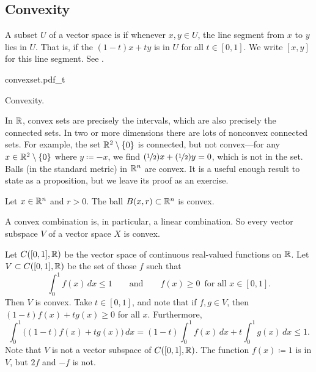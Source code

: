 \subsection{Convexity}

A subset $U$ of a vector space is \emph{}
if whenever $x,y \in U$, the line segment from
$x$ to $y$ lies in $U$.  That is, if the \emph{}
$(1-t)x+ty$ is in $U$ for all $t \in [0,1]$.
We write $[x,y]$ for this line segment.
See .

\begin{myfigureht}
{convexset.pdf_t}
\caption{Convexity.\label{mv:convexcomb}}
\end{myfigureht}

In ${\mathbb{R}}$, convex sets are precisely the intervals, which are
also precisely the connected sets.
In two or more dimensions
there are lots of nonconvex connected sets.  For example,
the set ${\mathbb{R}}^2 \setminus \{0\}$ is connected,
but not convex---for any $x \in {\mathbb{R}}^2 \setminus \{0\}$ where $y \coloneqq -x$,
we find
$(\nicefrac{1}{2})x + (\nicefrac{1}{2})y = 0$, which is not in the set.
Balls (in the standard metric) in ${\mathbb{R}}^n$ are convex.  It is
a useful enough result to state as a proposition,
but we leave its proof as an exercise.

\begin{prop}
Let $x \in {\mathbb{R}}^n$ and $r > 0$.  The ball $B(x,r) \subset {\mathbb{R}}^n$
is convex.
\end{prop}

\begin{example}
A convex combination is, in particular, a linear combination.
So every vector subspace $V$ of a vector space $X$ is convex.
\end{example}

\begin{example}
Let $C([0,1],{\mathbb{R}})$ be the vector space of continuous real-valued functions on ${\mathbb{R}}$.
Let $V \subset C([0,1],{\mathbb{R}})$ be the set of those $f$ such that
\begin{equation*}
\int_0^1 f(x)\,dx \leq 1 \qquad \text{and} \qquad
f(x) \geq 0 \enspace \text{for all } x \in [0,1] .
\end{equation*}
Then $V$ is convex.  Take $t \in [0,1]$, and note that if $f,g \in V$,
then $(1-t) f(x) + t g(x) \geq 0$ for all $x$.  Furthermore,
\begin{equation*}
\int_0^1 \bigl((1-t)f(x) + t g(x)\bigr) \,dx
=
(1-t) \int_0^1 f(x) \,dx
+ t \int_0^1 g(x) \,dx \leq 1 .
\end{equation*}
Note that $V$ is not a vector subspace of $C([0,1],{\mathbb{R}})$.  The function
$f(x) \coloneqq 1$ is in $V$, but $2f$ and $-f$ is not.
\end{example}

